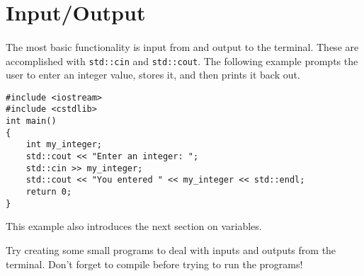 \section{Input/Output}
\paragraph{} The most basic functionality is input from and output to the terminal.  These are accomplished with \texttt{std::cin} and \texttt{std::cout}.  The following example prompts the user to enter an integer value, stores it, and then prints it back out.

\begin{verbatim}
#include <iostream>
#include <cstdlib>
int main()
{
    int my_integer;
    std::cout << "Enter an integer: ";
    std::cin >> my_integer;
    std::cout << "You entered " << my_integer << std::endl;
    return 0;
}
\end{verbatim}
This example also introduces the next section on variables.

\begin{homework}
Try creating some small programs to deal with inputs and outputs from the terminal.  Don't forget to compile before trying to run the programs!
\end{homework}
